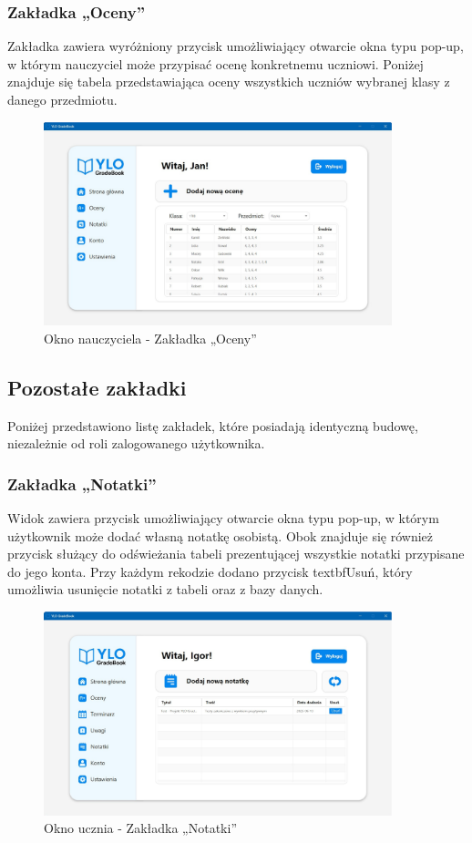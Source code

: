 \subsubsection{Zakładka „Oceny”}
Zakładka zawiera wyróżniony przycisk umożliwiający otwarcie okna typu pop-up, w którym nauczyciel może przypisać ocenę konkretnemu uczniowi.
Poniżej znajduje się tabela przedstawiająca oceny wszystkich uczniów wybranej klasy z danego przedmiotu.
\begin{figure}[H]
    \centering
    \includegraphics[width=0.9\textwidth]{figures/TeacherWindow/fig_0012.eps}
    \caption{Okno nauczyciela - Zakładka „Oceny”}
    \label{fig:teacherGradePane}
\end{figure}


\newpage
\subsection{Pozostałe zakładki}
Poniżej przedstawiono listę zakładek, które posiadają identyczną budowę, niezależnie od roli zalogowanego użytkownika.

\subsubsection{Zakładka „Notatki”}
Widok zawiera przycisk umożliwiający otwarcie okna typu pop-up, w którym użytkownik może dodać własną notatkę osobistą. Obok znajduje się również przycisk służący do odświeżania tabeli prezentującej wszystkie notatki przypisane do jego konta. Przy każdym rekodzie dodano przycisk textbf{Usuń}, który umożliwia usunięcie notatki z tabeli oraz z bazy danych.
\begin{figure}[H]
    \centering
    \includegraphics[width=0.9\textwidth]{figures/StudentWindow/fig_0013.eps}
    \caption{Okno ucznia - Zakładka „Notatki”}
    \label{fig:studentNotesPane}
\end{figure}
\newpage
